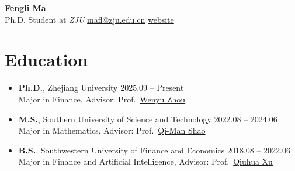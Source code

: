 \documentclass[11pt, a4paper]{article}
\begin{document}
\begin{center}
  {\LARGE\bfseries Fengli Ma}\\[6pt]
  Ph.D. Student at \textit{ZJU} \quad\textbar\quad
  \href{mailto:mafl@zju.edu.cn}{mafl@zju.edu.cn} \quad\textbar\quad 
  \href{https://sharpma.github.io}{website} 
\end{center}

\section{Education}

\begin{itemize}
  \item \textbf{Ph.D.}, Zhejiang University \hfill 2025.09 -- Present\\[4pt]
    Major in Finance,
    Advisor: Prof.\ \href{https://person.zju.edu.cn/wenyuzhou}{Wenyu Zhou}

  \item \textbf{M.S.}, Southern University of Science and Technology \hfill 2022.08 -- 2024.06\\[4pt]
    Major in Mathematics,
    Advisor: Prof.\ \href{https://faculty.sustech.edu.cn/shaoqm}{Qi-Man Shao}

  \item \textbf{B.S.}, Southwestern University of Finance and Economics \hfill 2018.08 -- 2022.06\\[4pt]
    Major in Finance and Artificial Intelligence,
    Advisor: Prof.\ \href{https://jinrong.swufe.edu.cn/info/2039/23537.htm}{Qiuhua Xu}
\end{itemize}


\end{document}
